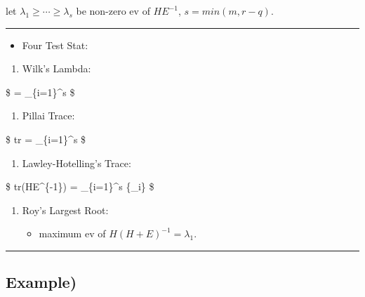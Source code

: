 \documentclass[
]{book}
\providecommand{\tightlist}{%
  \setlength{\itemsep}{0pt}\setlength{\parskip}{0pt}}
\begin{document}
{{let \(\lambda_1 \ge \cdots \ge \lambda_s\) be non-zero ev of \(HE^{-1}\), \(s=min(m, r-q)\).

\begin{center}\rule{0.5\linewidth}{0.5pt}\end{center}

\begin{itemize}
\tightlist
\item
  Four Test Stat:
\end{itemize}

\begin{enumerate}
\def\labelenumi{\arabic{enumi}.}
\tightlist
\item
  Wilk's Lambda:
\end{enumerate}

\$
 = \prod\_\{i=1\}\^{}s 
\$

\begin{enumerate}
\def\labelenumi{\arabic{enumi}.}
\setcounter{enumi}{1}
\tightlist
\item
  Pillai Trace:
\end{enumerate}

\$
tr \left[ H(H+E)^{-1} \right] = \sum\_\{i=1\}\^{}s 
\$

\begin{enumerate}
\def\labelenumi{\arabic{enumi}.}
\setcounter{enumi}{2}
\tightlist
\item
  Lawley-Hotelling's Trace:
\end{enumerate}

\$
tr(HE\^{}\{-1\}) = \sum\_\{i=1\}\^{}s \{\lambda\_i\}
\$

\begin{enumerate}
\def\labelenumi{\arabic{enumi}.}
\setcounter{enumi}{3}
\tightlist
\item
  Roy's Largest Root:

  \begin{itemize}
  \tightlist
  \item
    maximum ev of \(H(H+E)^{-1} = \lambda_1\).
  \end{itemize}
\end{enumerate}

\begin{center}\rule{0.5\linewidth}{0.5pt}\end{center}

\hypertarget{example}{%
\subsection{Example)}\label{example}}

}}
\end{document}
